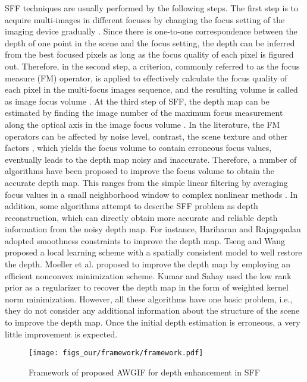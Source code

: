 \documentclass[a4paper,fleqn]{cas-dc}
\begin{document}
SFF techniques are usually performed by the following steps. The first step is to acquire multi-images in different focuses by changing the focus setting of the imaging device gradually \cite{nayar1994shape}. Since there is one-to-one correspondence between the depth of one point in the scene and the focus setting, the depth can be inferred from the best focused pixels  as long as the focus quality of each pixel is figured out. Therefore, in the second step, a criterion, commonly referred to as the focus measure (FM) operator, is applied to effectively calculate the focus quality of each pixel in the multi-focus images sequence, and the resulting volume is called as image focus volume \cite{mahmood2012nonlinear}. At the third step of SFF, the depth map can be estimated by finding the image number of the maximum focus measurement along the optical axis in the image focus volume \cite{ali2019image}. In the literature, the FM operators can be affected by noise level, contrast, the scene texture and other factors \cite{pertuz2013analysis}, which yields the focus volume to contain erroneous focus values, eventually leads to the depth map noisy and inaccurate. Therefore, a number of algorithms have been proposed to improve the focus volume to obtain the accurate depth map. This ranges from the simple linear filtering by averaging focus values in a small neighborhood window \cite{nayar1994shape,thelen2009improvements,jang2019optimal} to complex nonlinear methods \cite{mahmood2012nonlinear,ali2019image,mahmood2019cross,ma2020shape}. In addition, some algorithms attempt to describe SFF problem as depth reconstruction, which can directly obtain more accurate and reliable depth information from the noisy depth map. For instance, Hariharan and Rajagopalan \cite{hariharan2012shape} adopted smoothness constraints to improve the depth map. Tseng and Wang \cite{tseng2014shape} proposed a local learning scheme with a spatially consistent model to well restore the depth. Moeller et al. \cite{moeller2015variational} proposed to improve the depth map by employing an efficient nonconvex minimization scheme. Kumar and Sahay \cite{prashanth2017accurate} used the low rank prior as a regularizer to recover the depth map in the form of weighted kernel norm minimization. However, all these algorithms have one basic problem, i.e., they do not consider any additional information about the structure of the scene to improve the depth map. Once the initial depth estimation is erroneous, a very little improvement is expected.

\begin{figure*}[htp]
	\centering
	\vspace*{0.5cm}
	\texttt{[image: figs\_our/framework/framework.pdf]}
	\caption{Framework of proposed AWGIF for depth enhancement in SFF}
	\label{fig:framework}
	\vspace*{-0.4cm}
\end{figure*}
\end{document}
